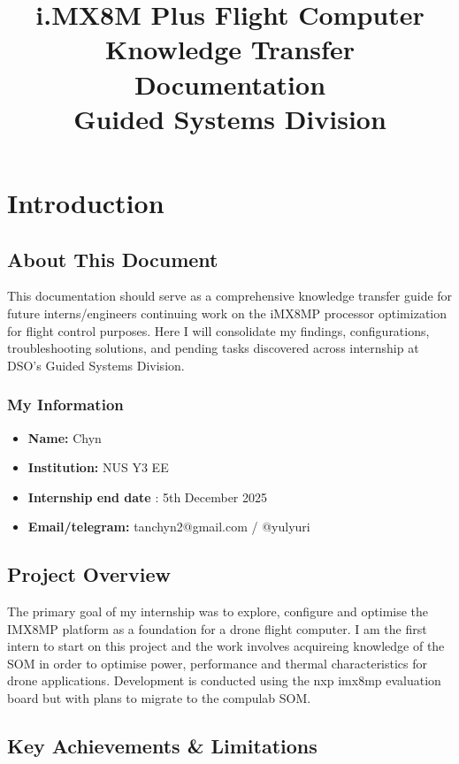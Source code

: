 \documentclass[12pt,a4paper]{report}
\title{
    \vspace{-2cm}
    \vspace{1cm}
    \Huge \textbf{i.MX8M Plus Flight Computer} \\
    \vspace{0.5cm}
    \Large Knowledge Transfer Documentation \\
    \vspace{0.3cm}
    \large Guided Systems Division
}
\begin{document}
\maketitle
\thispagestyle{empty}

\tableofcontents
\newpage

\chapter{Introduction}

\section{About This Document}
This documentation should serve as a comprehensive knowledge transfer guide for future interns/engineers continuing work on the iMX8MP processor optimization for flight control purposes. Here I will consolidate my findings, configurations, troubleshooting solutions, and pending tasks discovered across  internship at DSO's Guided Systems Division. 

\subsection{My Information}
\begin{itemize}
    \item \textbf{Name:} Chyn
    \item \textbf{Institution:} NUS Y3 EE
    \item \textbf{Internship end date} : 5th December 2025
    \item \textbf{Email/telegram:} tanchyn2@gmail.com / @yulyuri
\end{itemize}

\section{Project Overview}
The primary goal of my internship was to explore, configure and optimise the IMX8MP platform as a foundation for a drone flight computer. I am the first intern to start on this project and the work involves acquireing knowledge of the SOM in order to optimise power, performance and thermal characteristics for drone applications. Development is conducted using the nxp imx8mp evaluation board but with plans to migrate to the compulab SOM.
\pagebreak
\section{Key Achievements \& Limitations}
\end{document}
